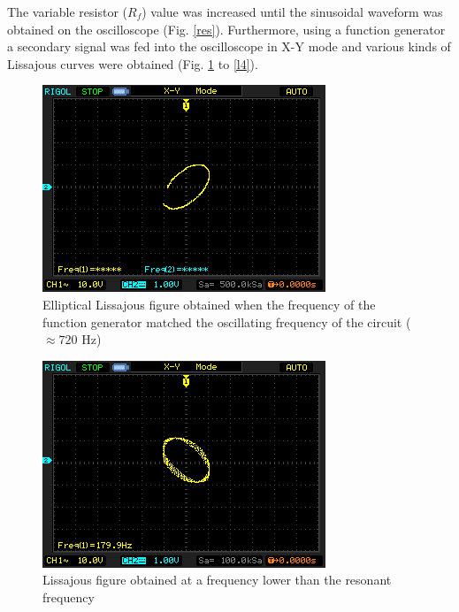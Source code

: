 The variable resistor ($R_f$) value was increased until the sinusoidal waveform was obtained on the oscilloscope (Fig. \ref{res}). Furthermore, using a function generator a secondary signal was fed into the oscilloscope in X-Y mode and various kinds of Lissajous curves were obtained (Fig. \ref{l1} to \ref{l4}).

\begin{figure}[H]
    \centering
    \includegraphics[width=0.8\columnwidth]{images/lissajous1.png}
    \caption{Elliptical Lissajous figure obtained when the frequency of the function generator matched the oscillating frequency of the circuit ($\approx 720$ Hz)}
    \label{l1}
\end{figure}

\begin{figure}[H]
    \centering
    \includegraphics[width=0.75\columnwidth]{images/lissajous2.png}
    \caption{Lissajous figure obtained at a frequency lower than the resonant frequency}
    \label{l2}
\end{figure}

